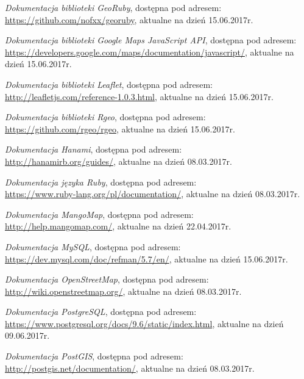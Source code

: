 \documentclass[printmode]{mgr}
\begin{document}
\begin{thebibliography}{inz}

  \emph{Dokumentacja biblioteki GeoRuby}, dostępna pod adresem:\\ \url{https://github.com/nofxx/georuby}, aktualne na dzień 15.06.2017r.

  \emph{Dokumentacja biblioteki Google Maps JavaScript API}, dostępna pod adresem:\\ \url{https://developers.google.com/maps/documentation/javascript/}, aktualne na dzień 15.06.2017r.

  \emph{Dokumentacja biblioteki Leaflet}, dostępna pod adresem:\\ \url{http://leafletjs.com/reference-1.0.3.html}, aktualne na dzień 15.06.2017r.

  \emph{Dokumentacja biblioteki Rgeo}, dostępna pod adresem:\\ \url{https://github.com/rgeo/rgeo}, aktualne na dzień 15.06.2017r.

  \emph{Dokumentacja Hanami}, dostępna pod adresem:\\ \url{http://hanamirb.org/guides/}, aktualne na dzień 08.03.2017r.

  \emph{Dokumentacja języka Ruby}, dostępna pod adresem:\\ \url{https://www.ruby-lang.org/pl/documentation/}, aktualne na dzień 08.03.2017r.

  \emph{Dokumentacja MangoMap}, dostępna pod adresem:\\ \url{http://help.mangomap.com/}, aktualne na dzień 22.04.2017r.

  \emph{Dokumentacja MySQL}, dostępna pod adresem:\\ \url{https://dev.mysql.com/doc/refman/5.7/en/}, aktualne na dzień 15.06.2017r.

  \emph{Dokumentacja OpenStreetMap}, dostępna pod adresem:\\ \url{http://wiki.openstreetmap.org/}, aktualne na dzień 08.03.2017r.

  \emph{Dokumentacja PostgreSQL}, dostępna pod adresem:\\ \url{https://www.postgresql.org/docs/9.6/static/index.html}, aktualne na dzień 09.06.2017r.

  \emph{Dokumentacja PostGIS}, dostępna pod adresem:\\ \url{http://postgis.net/documentation/}, aktualne na dzień 08.03.2017r.


\end{thebibliography}
\end{document}
